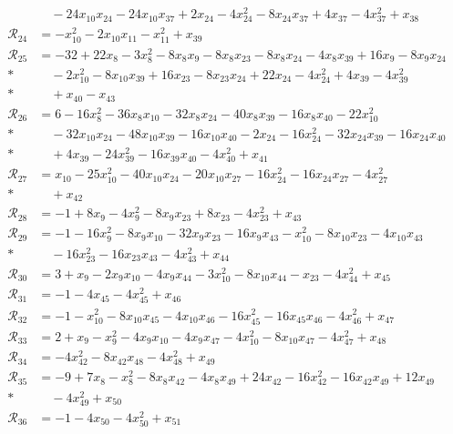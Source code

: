 \begin{align*}
&\quad -24x_{10}x_{24} -24x_{10}x_{37} +2x_{24} -4x_{24}^{2} -8x_{24}x_{37} +4x_{37} -4x_{37}^{2} +x_{38} \\
\mathcal R_{24} &= -x_{10}^{2} -2x_{10}x_{11} -x_{11}^{2} +x_{39} \\
\mathcal R_{25} &= -32 +22x_{8} -3x_{8}^{2} -8x_{8}x_{9} -8x_{8}x_{23} -8x_{8}x_{24} -4x_{8}x_{39} +16x_{9} -8x_{9}x_{24} \\*
&\quad -2x_{10}^{2} -8x_{10}x_{39} +16x_{23} -8x_{23}x_{24} +22x_{24} -4x_{24}^{2} +4x_{39} -4x_{39}^{2} \\*
&\quad +x_{40} -x_{43} \\
\mathcal R_{26} &= 6 -16x_{8}^{2} -36x_{8}x_{10} -32x_{8}x_{24} -40x_{8}x_{39} -16x_{8}x_{40} -22x_{10}^{2} \\*
&\quad -32x_{10}x_{24} -48x_{10}x_{39} -16x_{10}x_{40} -2x_{24} -16x_{24}^{2} -32x_{24}x_{39} -16x_{24}x_{40} \\*
&\quad +4x_{39} -24x_{39}^{2} -16x_{39}x_{40} -4x_{40}^{2} +x_{41} \\
\mathcal R_{27} &= x_{10} -25x_{10}^{2} -40x_{10}x_{24} -20x_{10}x_{27} -16x_{24}^{2} -16x_{24}x_{27} -4x_{27}^{2} \\*
&\quad +x_{42} \\
\mathcal R_{28} &= -1 +8x_{9} -4x_{9}^{2} -8x_{9}x_{23} +8x_{23} -4x_{23}^{2} +x_{43} \\
\mathcal R_{29} &= -1 -16x_{9}^{2} -8x_{9}x_{10} -32x_{9}x_{23} -16x_{9}x_{43} -x_{10}^{2} -8x_{10}x_{23} -4x_{10}x_{43} \\*
&\quad -16x_{23}^{2} -16x_{23}x_{43} -4x_{43}^{2} +x_{44} \\
\mathcal R_{30} &= 3 +x_{9} -2x_{9}x_{10} -4x_{9}x_{44} -3x_{10}^{2} -8x_{10}x_{44} -x_{23} -4x_{44}^{2} +x_{45} \\
\mathcal R_{31} &= -1 -4x_{45} -4x_{45}^{2} +x_{46} \\
\mathcal R_{32} &= -1 -x_{10}^{2} -8x_{10}x_{45} -4x_{10}x_{46} -16x_{45}^{2} -16x_{45}x_{46} -4x_{46}^{2} +x_{47} \\
\mathcal R_{33} &= 2 +x_{9} -x_{9}^{2} -4x_{9}x_{10} -4x_{9}x_{47} -4x_{10}^{2} -8x_{10}x_{47} -4x_{47}^{2} +x_{48} \\
\mathcal R_{34} &= -4x_{42}^{2} -8x_{42}x_{48} -4x_{48}^{2} +x_{49} \\
\mathcal R_{35} &= -9 +7x_{8} -x_{8}^{2} -8x_{8}x_{42} -4x_{8}x_{49} +24x_{42} -16x_{42}^{2} -16x_{42}x_{49} +12x_{49} \\*
&\quad -4x_{49}^{2} +x_{50} \\
\mathcal R_{36} &= -1 -4x_{50} -4x_{50}^{2} +x_{51} \\

\end{align*}
